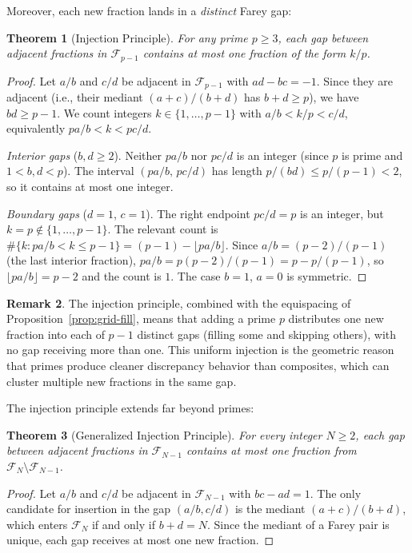 \documentclass[11pt]{article}
\newtheorem{theorem}{Theorem}[section]
\theoremstyle{definition}
\newtheorem{remark}[theorem]{Remark}
\newcommand{\F}{\mathcal{F}}
\begin{document}
Moreover, each new fraction lands in a \emph{distinct} Farey gap:

\begin{theorem}[Injection Principle]\label{thm:injection}
For any prime $p \ge 3$, each gap between adjacent fractions in
$\F_{p-1}$ contains at most one fraction of the form $k/p$.
\end{theorem}

\begin{proof}
Let $a/b$ and $c/d$ be adjacent in $\F_{p-1}$ with $ad - bc = -1$.
Since they are adjacent (i.e., their mediant $(a+c)/(b+d)$ has
$b+d \ge p$), we have $bd \ge p-1$.  We count integers $k \in
\{1, \ldots, p-1\}$ with $a/b < k/p < c/d$, equivalently
$pa/b < k < pc/d$.

\emph{Interior gaps} ($b, d \ge 2$).  Neither $pa/b$ nor
$pc/d$ is an integer (since $p$ is prime and $1 < b, d < p$).
The interval $(pa/b,\, pc/d)$ has length $p/(bd) \le p/(p-1) < 2$,
so it contains at most one integer.

\emph{Boundary gaps} ($d = 1$, $c = 1$).  The right endpoint
$pc/d = p$ is an integer, but $k = p \notin \{1, \ldots, p-1\}$.
The relevant count is $\#\{k : pa/b < k \le p-1\} = (p-1) -
\lfloor pa/b \rfloor$.  Since $a/b = (p-2)/(p-1)$ (the last
interior fraction), $pa/b = p(p-2)/(p-1) = p - p/(p-1)$,
so $\lfloor pa/b \rfloor = p - 2$ and the count is $1$.
The case $b = 1$, $a = 0$ is symmetric.
\end{proof}

\begin{remark}
The injection principle, combined with the equispacing of
Proposition~\ref{prop:grid-fill}, means that adding a prime $p$
distributes one new fraction into each of $p - 1$ distinct gaps
(filling some and skipping others), with no gap receiving more
than one.  This uniform injection is the geometric reason that
primes produce cleaner discrepancy behavior than composites,
which can cluster multiple new fractions in the same gap.
\end{remark}

The injection principle extends far beyond primes:

\begin{theorem}[Generalized Injection Principle]\label{thm:gen-injection}
For every integer $N \ge 2$, each gap between adjacent fractions in
$\F_{N-1}$ contains at most one fraction from $\F_N \setminus \F_{N-1}$.
\end{theorem}

\begin{proof}
Let $a/b$ and $c/d$ be adjacent in $\F_{N-1}$ with $bc - ad = 1$.
The only candidate for insertion in the gap $(a/b, c/d)$ is the
mediant $(a+c)/(b+d)$, which enters $\F_N$ if and only if
$b + d = N$.  Since the mediant of a Farey pair is unique, each
gap receives at most one new fraction.
\end{proof}
\end{document}
